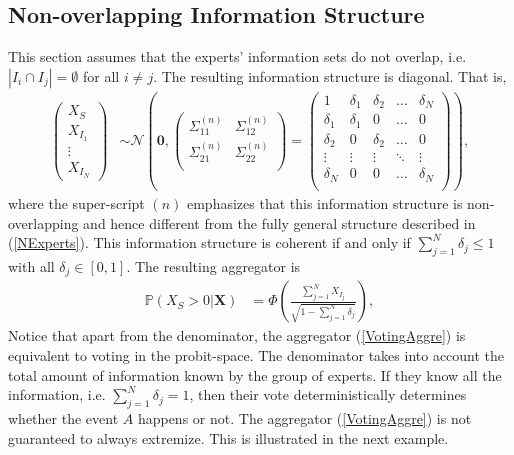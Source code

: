 \documentclass[11pt,twoside]{article}
\renewcommand{\P}{\mathbb{P}}
\theoremstyle{definition}
\theoremstyle{definition}
\begin{document}
\subsection{Non-overlapping Information Structure}
This section assumes that the experts' information sets do not overlap, i.e.   $|I_{i} \cap I_{j}| = \emptyset$ for all $i \neq j$. The resulting information structure is diagonal.  That is,
\begin{align*}
\left(\begin{matrix} X_{S} \\ X_{I_1}\\ \vdots \\ X_{I_N} \end{matrix}\right) &\sim \mathcal{N}\left( 
 \boldsymbol{0}, \left(\begin{matrix} 
\Sigma_{11}^{(n)} & \Sigma_{12}^{(n)}\\
\Sigma_{21}^{(n)} & \Sigma_{22}^{(n)}\\
 \end{matrix}\right) 
 =
 \left(\begin{array}{c|cccc}
1 & \delta_1 & \delta_2 & \dots & \delta_N  \\ \hline
\delta_1 & \delta_1 &0 & \dots & 0   \\ 
\delta_2 & 0 & \delta_2 & \dots & 0  \\ 
\vdots & \vdots & \vdots & \ddots & \vdots  \\ 
\delta_N & 0 & 0 & \dots & \delta_N\\ 
 \end{array}\right)\right),
\end{align*}
where the super-script $(n)$ emphasizes that this information structure is non-overlapping and hence different from the fully general structure described in (\ref{NExperts}). This information structure  is coherent if and only if $\sum_{j=1}^N \delta_j \leq 1$ with all $\delta_j \in [0,1]$. The resulting aggregator is 
\begin{align}
\P\left(X_{S} > 0 | \boldsymbol{X}\right) &= \Phi\left( \frac{\sum_{j=1}^N X_{I_j}}{\sqrt{1 - \sum_{j=1}^N \delta_j}}\right), \label{VotingAggre}
\end{align}
Notice that apart from the denominator, the aggregator (\ref{VotingAggre}) is equivalent to voting in the probit-space. The denominator takes into account the total amount of information known by the group of experts. If they know all the information, i.e. $\sum_{j=1}^N \delta_j = 1$, then their vote deterministically determines whether the event $A$ happens or not. The aggregator (\ref{VotingAggre}) is not guaranteed to always extremize. This is illustrated in the next example.
\end{document}
